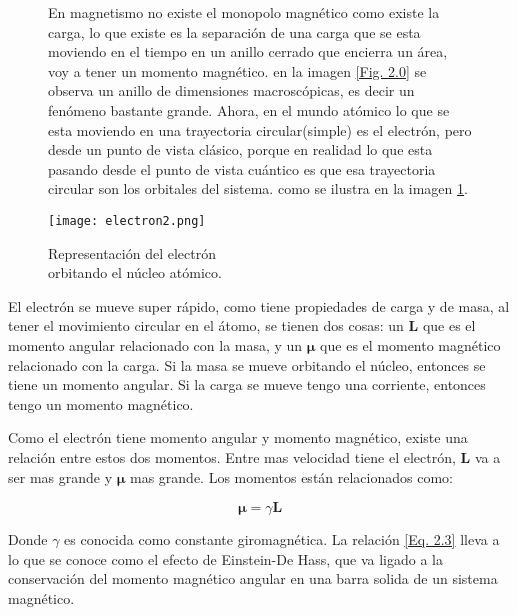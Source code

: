 \documentclass[11pt,fleqn]{book}
\renewcommand{\vec}[1]{\mathbf{#1}}
\begin{document}
\begin{figure}[H]
\begin{minipage}[c]{0.6\linewidth}
\hspace{5mm} En magnetismo no existe el monopolo magnético como existe la carga, lo que existe es la separación de una carga que se esta moviendo en el tiempo en un anillo cerrado que encierra un área, voy a tener un momento magnético. en la imagen \ref{Fig. 2.0} se observa un anillo de dimensiones macroscópicas, es decir un fenómeno bastante grande. Ahora, en el mundo atómico lo que se esta moviendo en una trayectoria circular(simple) es el electrón, pero desde un punto de vista clásico, porque en realidad lo que esta pasando desde el punto de vista cuántico es que esa trayectoria circular son los orbitales del sistema. como se ilustra en la imagen \ref{Fig. 2.3}.
    \end{minipage}\hspace{5mm}
    \begin{minipage}[c]{0.4\linewidth}
    \centering
        \texttt{[image: electron2.png]}
    \caption{Representación del electrón\\ orbitando el núcleo atómico.}
    \label{Fig. 2.3}
\end{minipage}
\end{figure}
\vspace{-5.5mm}

El electrón se mueve super rápido, como tiene propiedades de carga y de masa, al tener el movimiento circular en el átomo, se tienen dos cosas: un $\vec{L}$ que es el momento angular relacionado con la masa, y un $\vec{\mu}$ que es el momento magnético relacionado con la carga. Si la masa se mueve orbitando el núcleo, entonces se tiene un momento angular. Si la carga se mueve tengo una corriente, entonces tengo un momento magnético.

Como el electrón tiene momento angular y momento magnético, existe una relación entre estos dos momentos.  Entre mas velocidad tiene el electrón, $\vec{L}$ va a ser mas grande y $\vec{\mu}$ mas grande. Los momentos están relacionados como:

\begin{equation}
    \vec{\mu}=\gamma\vec{L}
    \label{Eq. 2.3}
\end{equation}

Donde $\gamma$ es conocida como constante giromagnética. La relación \ref{Eq. 2.3} lleva a lo que se conoce como el efecto de Einstein-De Hass, que va ligado a la conservación del momento magnético angular en una barra solida de un sistema magnético.
\end{document}
